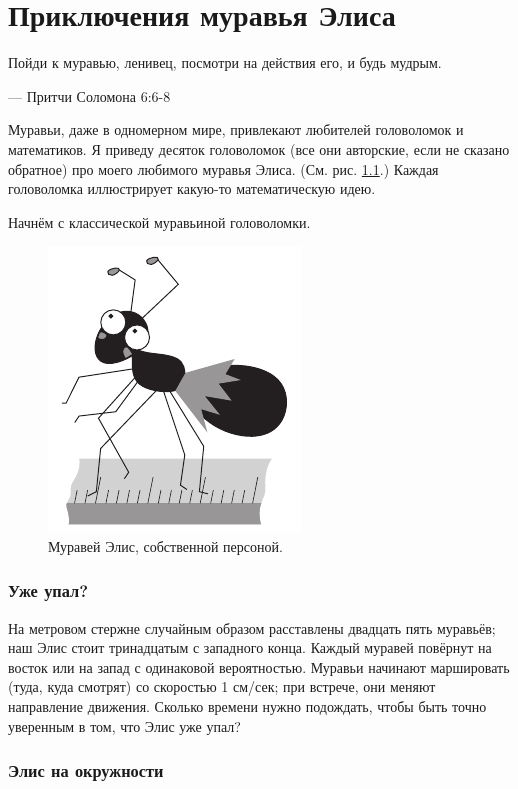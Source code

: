 \chapter{Приключения муравья Элиса}


\setlength{\epigraphwidth}{.67\textwidth}
\epigraph{Пойди к муравью, ленивец, посмотри на действия его, и будь мудрым.
}{--- Притчи Соломона 6:6-8} 

Муравьи, даже в одномерном мире, привлекают любителей головоломок и математиков.
Я приведу десяток головоломок (все они авторские, если не сказано обратное) про моего любимого муравья Элиса.
(См. рис. \ref{pic:alice1}.)
Каждая головоломка иллюстрирует какую-то математическую идею.

Начнём с классической муравьиной головоломки.

\begin{figure}[ht!]
\centering
\includegraphics[scale=.5]{pics/alice1}
\caption{Муравей Элис, собственной персоной.}
\label{pic:alice1}
\end{figure}

\subsection*{Уже упал?}\label{Уже упал?}

На метровом стержне случайным образом расставлены двадцать пять муравьёв; наш Элис стоит тринадцатым с западного конца.
Каждый муравей повёрнут на восток или на запад с одинаковой вероятностью.
Муравьи начинают маршировать (туда, куда смотрят) со скоростью 1 см/сек;
при встрече, они меняют направление движения.
Сколько времени нужно подождать, чтобы быть точно уверенным в том, что Элис уже упал?

\subsection*{Элис на окружности}\label{Элис на окружности}

